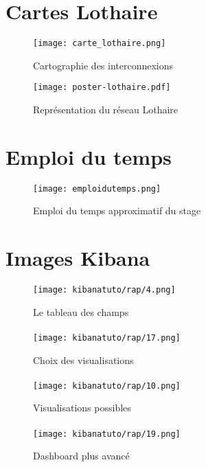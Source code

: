 \section{Cartes Lothaire}
\begin{figure}[H]
    \center
    \texttt{[image: carte\_lothaire.png]}
    \label{fig:imagereseaulothaire1}
    \caption{Cartographie des interconnexions}
\end{figure}
\begin{figure}[H]
    \center
    \texttt{[image: poster-lothaire.pdf]}
    \label{fig:imagereseaulothaire2}
    \caption{Représentation du réseau Lothaire}
\end{figure}

\section{Emploi du temps}
\begin{figure}[H]
    \center
    \texttt{[image: emploidutemps.png]}
    \label{fig:emploidutemps}
    \caption{Emploi du temps approximatif du stage}
\end{figure}

\section{Images Kibana}
\begin{figure}[H]
\center
\texttt{[image: kibanatuto/rap/4.png]}
\label{fig:kibanatuto4}
\caption{Le tableau des champs}
\end{figure}
\paragraph{}
\begin{figure}[H]
\center
\texttt{[image: kibanatuto/rap/17.png]}
\label{fig:kibanatuto10}
\caption{Choix des visualisations}
\end{figure}
\paragraph{}
\begin{figure}[H]
\center
\texttt{[image: kibanatuto/rap/10.png]}
\label{fig:kibanatuto7}
\caption{Visualisations possibles}
\end{figure}
\paragraph{}
\begin{figure}[H]
\center
\texttt{[image: kibanatuto/rap/19.png]}
\label{fig:kibanatuto12}
\caption{Dashboard plus avancé}
\end{figure}

